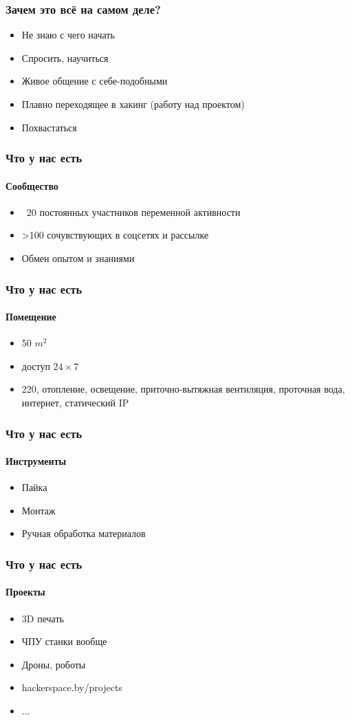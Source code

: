 \documentclass{beamer}
\begin{document}
\begin {frame}
\frametitle {Зачем это всё на самом деле?}
\begin{itemize}
\item Не знаю с чего начать
\item Спросить, научиться
\item Живое общение с себе-подобными
\item Плавно переходящее в хакинг (работу над проектом)
\item Похвастаться
\end{itemize}
\end {frame}


\begin {frame}
\frametitle {Что у нас есть}
\framesubtitle {Сообщество}
\begin{itemize}
\item ~20 постоянных участников переменной активности
\item >100 сочувствующих в соцсетях и рассылке
\item Обмен опытом и знаниями
\end{itemize}
\end {frame}


\begin {frame}
\frametitle {Что у нас есть}
\framesubtitle {Помещение}
\begin{itemize}
\item 50 \(m^2\)
\item доступ \(24\times7\)
\item 220, отопление, освещение, приточно-вытяжная вентиляция, проточная вода, интернет, статический IP
\end{itemize}
\end {frame}


\begin {frame}
\frametitle {Что у нас есть}
\framesubtitle {Инструменты}
\begin{itemize}
\item Пайка
\item Монтаж
\item Ручная обработка материалов
\end{itemize}
\end {frame}


\begin {frame}
\frametitle {Что у нас есть}
\framesubtitle {Проекты}
\begin{itemize}
\item 3D печать
\item ЧПУ станки вообще
\item Дроны, роботы
\item hackerspace.by/projects
\item ...
\end{itemize}
\end {frame}
\end{document}
